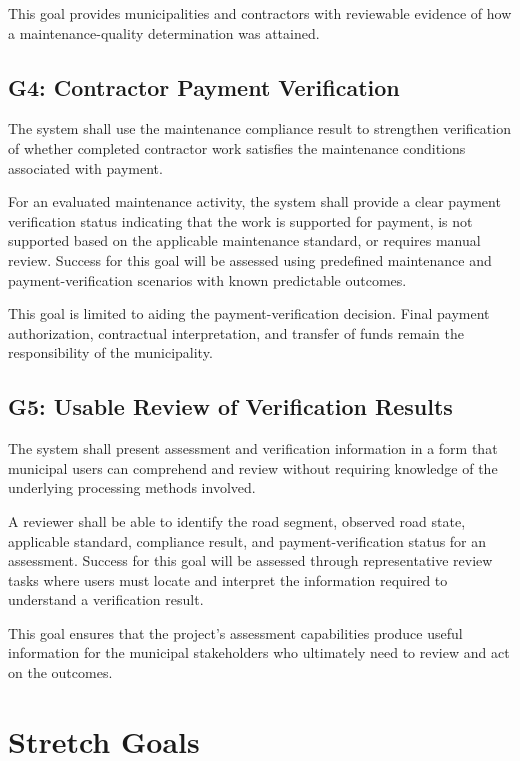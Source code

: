 \documentclass{article}
\begin{document}
This goal provides municipalities and contractors with reviewable evidence of
how a maintenance-quality determination was attained.

\subsection{G4: Contractor Payment Verification}

The system shall use the maintenance compliance result to strengthen verification
of whether completed contractor work satisfies the maintenance conditions
associated with payment.

For an evaluated maintenance activity, the system shall provide a clear payment
verification status indicating that the work is supported for payment, is not
supported based on the applicable maintenance standard, or requires manual
review. Success for this goal will be assessed using predefined maintenance
and payment-verification scenarios with known predictable outcomes.

This goal is limited to aiding the payment-verification decision. Final
payment authorization, contractual interpretation, and transfer of funds remain
the responsibility of the municipality.

\subsection{G5: Usable Review of Verification Results}

The system shall present assessment and verification information in a form that
municipal users can comprehend and review without requiring knowledge of the
underlying processing methods involved.

A reviewer shall be able to identify the road segment, observed road state,
applicable standard, compliance result, and payment-verification status for an
assessment. Success for this goal will be assessed through representative
review tasks where users must locate and interpret the information required
to understand a verification result.

This goal ensures that the project's assessment capabilities produce useful
information for the municipal stakeholders who ultimately need to review and
act on the outcomes.

\section{Stretch Goals}
\end{document}

